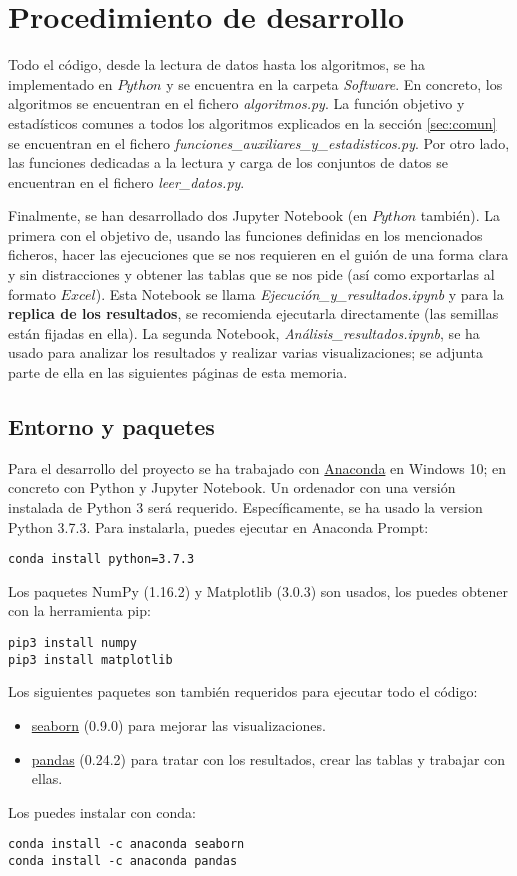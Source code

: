 \documentclass[11pt,a4paper]{article}
\begin{document}
	\section{Procedimiento de desarrollo}
	
	Todo el código, desde la lectura de datos hasta los algoritmos, se ha implementado en $Python$ y se encuentra en la carpeta \textit{Software}. En concreto, los algoritmos se encuentran en el fichero \textit{algoritmos.py}. La función objetivo y estadísticos comunes a todos los algoritmos explicados en la sección \ref{sec:comun} se encuentran en el fichero \textit{funciones\_auxiliares\_y\_estadisticos.py}. Por otro lado, las funciones dedicadas a la lectura y carga de los conjuntos de datos se encuentran en el fichero \textit{leer\_datos.py}.
	
	Finalmente, se han desarrollado dos Jupyter Notebook (en $Python$ también). La primera con el objetivo de, usando las funciones definidas en los mencionados ficheros, hacer las ejecuciones que se nos requieren en el guión de una forma clara y sin distracciones y obtener las tablas que se nos pide (así como exportarlas al formato $Excel$). Esta Notebook se llama \textit{Ejecución\_y\_resultados.ipynb} y para la \textbf{replica de los resultados}, se recomienda ejecutarla directamente (las semillas están fijadas en ella). La segunda Notebook, \textit{Análisis\_resultados.ipynb}, se ha usado para analizar los resultados y realizar varias visualizaciones; se adjunta parte de ella en las siguientes páginas de esta memoria.
	
	\subsection{Entorno y paquetes}
Para el desarrollo del proyecto se ha trabajado con \href{https://www.anaconda.com/download/}{Anaconda} en Windows 10;  en concreto con Python y Jupyter Notebook. Un ordenador con una versión instalada de Python 3 será requerido. Específicamente, se ha usado la version Python 3.7.3. Para instalarla, puedes ejecutar en Anaconda Prompt:
\begin{lstlisting}
conda install python=3.7.3
\end{lstlisting}
Los paquetes NumPy (1.16.2) y Matplotlib (3.0.3) son usados, los puedes obtener con la herramienta pip:
\begin{lstlisting}
pip3 install numpy
pip3 install matplotlib
\end{lstlisting}

Los siguientes paquetes son también requeridos para ejecutar todo el código:
\begin{itemize}
    \item \href{https://seaborn.pydata.org/}{seaborn} (0.9.0) para mejorar las visualizaciones.
    \item \href{https://pandas.pydata.org/}{pandas} (0.24.2) para tratar con los resultados, crear las tablas y trabajar con ellas.
\end{itemize}
Los puedes instalar con conda:
\begin{lstlisting}
conda install -c anaconda seaborn
conda install -c anaconda pandas
\end{lstlisting}
	
\end{document}
